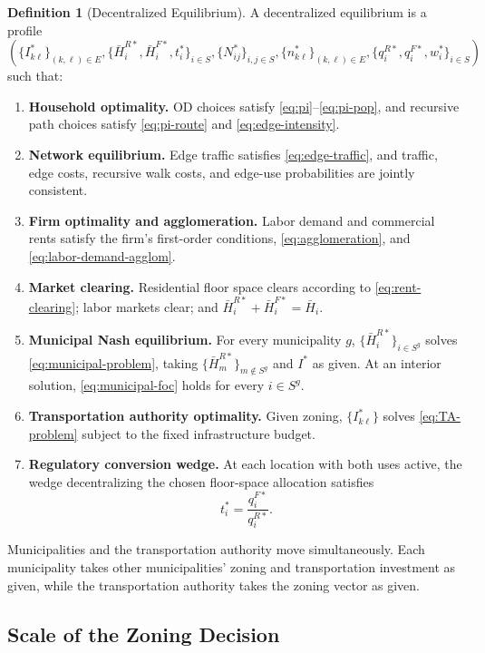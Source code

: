 \documentclass[12pt, a4paper]{article}
\theoremstyle{definition}
\newtheorem{definition}{Definition}
\theoremstyle{remark}
\begin{document}
\begin{definition}[Decentralized Equilibrium]
A decentralized equilibrium is a profile
\[
\left(
\{I_{k\ell}^*\}_{(k,\ell)\in E},
\{\bar H_i^{R*},\bar H_i^{F*},t_i^*\}_{i\in S},
\{N_{ij}^*\}_{i,j\in S},
\{n_{k\ell}^*\}_{(k,\ell)\in E},
\{q_i^{R*},q_i^{F*},w_i^*\}_{i\in S}
\right)
\]
such that:
\begin{enumerate}
    \item \textbf{Household optimality.} OD choices satisfy \eqref{eq:pi}--\eqref{eq:pi-pop}, and recursive path choices satisfy \eqref{eq:pi-route} and \eqref{eq:edge-intensity}.
    \item \textbf{Network equilibrium.} Edge traffic satisfies \eqref{eq:edge-traffic}, and traffic, edge costs, recursive walk costs, and edge-use probabilities are jointly consistent.
    \item \textbf{Firm optimality and agglomeration.} Labor demand and commercial rents satisfy the firm's first-order conditions, \eqref{eq:agglomeration}, and \eqref{eq:labor-demand-agglom}.
    \item \textbf{Market clearing.} Residential floor space clears according to \eqref{eq:rent-clearing}; labor markets clear; and $\bar H_i^{R*}+\bar H_i^{F*}=\bar H_i$.
    \item \textbf{Municipal Nash equilibrium.} For every municipality $g$, $\{\bar H_i^{R*}\}_{i\in S^g}$ solves \eqref{eq:municipal-problem}, taking $\{\bar H_m^{R*}\}_{m\notin S^g}$ and $I^*$ as given. At an interior solution, \eqref{eq:municipal-foc} holds for every $i\in S^g$.
    \item \textbf{Transportation authority optimality.} Given zoning, $\{I_{k\ell}^*\}$ solves \eqref{eq:TA-problem} subject to the fixed infrastructure budget.
    \item \textbf{Regulatory conversion wedge.} At each location with both uses active, the wedge decentralizing the chosen floor-space allocation satisfies
    \[
    t_i^*=\frac{q_i^{F*}}{q_i^{R*}}.
    \]
\end{enumerate}
Municipalities and the transportation authority move simultaneously. Each municipality takes other municipalities' zoning and transportation investment as given, while the transportation authority takes the zoning vector as given.
\end{definition}


\subsection{Scale of the Zoning Decision}
\end{document}
